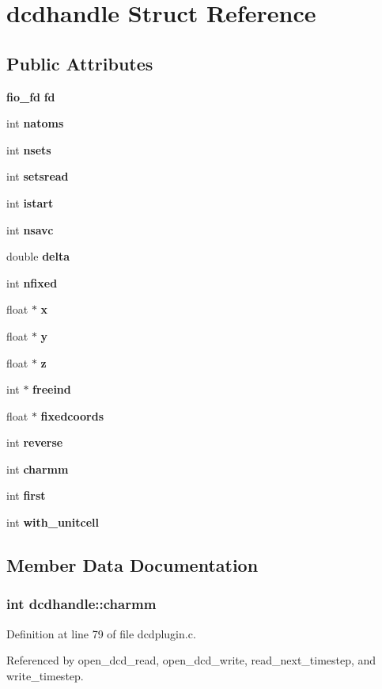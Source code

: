 \section{dcdhandle  Struct Reference}
\label{structdcdhandle}
\subsection*{Public Attributes}
\begin{CompactItemize}
\item 
{\bf fio\_\-fd} {\bf fd}
\item 
int {\bf natoms}
\item 
int {\bf nsets}
\item 
int {\bf setsread}
\item 
int {\bf istart}
\item 
int {\bf nsavc}
\item 
double {\bf delta}
\item 
int {\bf nfixed}
\item 
float $\ast$ {\bf x}
\item 
float $\ast$ {\bf y}
\item 
float $\ast$ {\bf z}
\item 
int $\ast$ {\bf freeind}
\item 
float $\ast$ {\bf fixedcoords}
\item 
int {\bf reverse}
\item 
int {\bf charmm}
\item 
int {\bf first}
\item 
int {\bf with\_\-unitcell}
\end{CompactItemize}


\subsection{Member Data Documentation}
\subsubsection{\setlength{\rightskip}{0pt plus 5cm}int dcdhandle::charmm}\label{structdcdhandle_m14}




Definition at line 79 of file dcdplugin.c.

Referenced by open\_\-dcd\_\-read, open\_\-dcd\_\-write, read\_\-next\_\-timestep, and write\_\-timestep.
